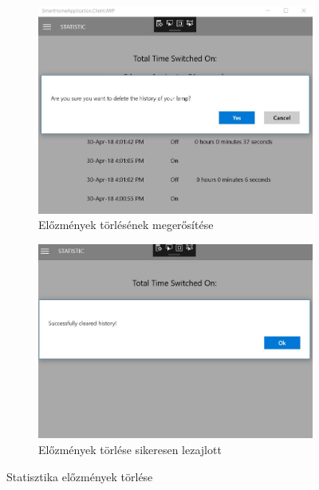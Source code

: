 \documentclass[a4paper,12pt]{report}
\begin{document}
    \begin{figure}[H]
        \centering
        \begin{subfigure}[b]{0.4\linewidth}
            \includegraphics[width=\linewidth]{images/statistichistoriydeletesure.jpg}
            \caption{Előzmények törlésének megerősítése}
        \end{subfigure}
        \begin{subfigure}[b]{0.4\linewidth}
            \includegraphics[width=\linewidth]{images/statisticdeletesucces.jpg}
            \caption{Előzmények törlése sikeresen lezajlott}
        \end{subfigure}
        \caption{Statisztika előzmények törlése}
        \label{fig:StatisticDelete}
    \end{figure}
\end{document}
